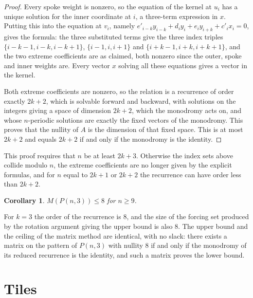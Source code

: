 \documentclass[11pt]{article}
\newtheorem{corollary}[theorem]{Corollary}
\theoremstyle{definition}
\begin{document}
\begin{proof}
Every spoke weight is nonzero, so the equation of the kernel at $u_i$ has a
unique solution for the inner coordinate at $i$, a three-term expression in $x$.
Putting this into the equation at $v_i$, namely
$e'_{i-k}y_{i-k}+d_iy_i+e_iy_{i+k}+c'_ix_i=0$, gives the formula: the three
substituted terms give the three index triples $\{i-k-1,i-k,i-k+1\}$,
$\{i-1,i,i+1\}$ and $\{i+k-1,i+k,i+k+1\}$, and the two extreme coefficients are
as claimed, both nonzero since the outer, spoke and inner weights are. Every
vector $x$ solving all these equations gives a vector in the kernel.

Both extreme coefficients are nonzero, so the relation is a recurrence of order
exactly $2k+2$, which is solvable forward and backward, with solutions on the
integers giving a space of dimension $2k+2$, which the monodromy acts on, and
whose $n$-periodic solutions are exactly the fixed vectors of the monodromy.
This proves that the nullity of $A$ is the dimension of that fixed space. This
is at most $2k+2$ and equals $2k+2$ if and only if the monodromy is the
identity.
\end{proof}

This proof requires that $n$ be at least $2k+3$. Otherwise the index sets above
collide modulo $n$, the extreme coefficients are no longer given by the explicit
formulas, and for $n$ equal to $2k+1$ or $2k+2$ the recurrence can have order
less than $2k+2$.

\begin{corollary}\label{cor:ceiling}
$M(P(n,3))\le8$ for $n\ge9$.
\end{corollary}

For $k=3$ the order of the recurrence is $8$, and the size of the forcing set
produced by the rotation argument giving the upper bound is also $8$. The upper
bound and the ceiling of the matrix method are identical, with no slack: there
exists a matrix on the pattern of $P(n,3)$ with nullity $8$ if and only if the
monodromy of its reduced recurrence is the identity, and such a matrix proves
the lower bound.

\section{Tiles}\label{sec:tiles}
\end{document}
